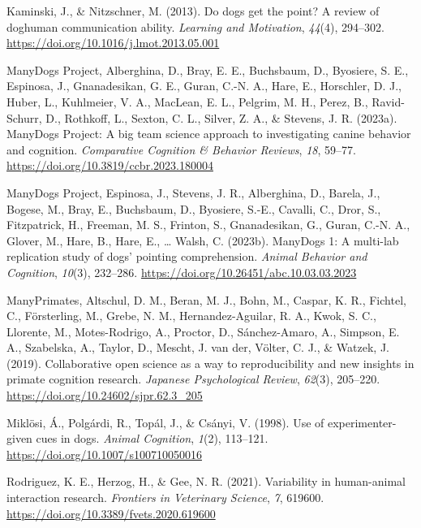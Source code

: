 \documentclass[
  pub,floatsintext]{apa6}
\newlength{\cslhangindent}
\newlength{\cslentryspacingunit} %
\newenvironment{CSLReferences}[2] %
 {%
  \setlength{\parindent}{0pt}
  \ifodd #1
  \let\oldpar\par
  \def\par{\hangindent=\cslhangindent\oldpar}
  \fi
  \setlength{\parskip}{#2\cslentryspacingunit}
 }%
 {}
\begin{document}
\begin{CSLReferences}{1}{0}
\leavevmode{}%
Kaminski, J., \& Nitzschner, M. (2013). Do dogs get the point? {A} review of dog{\textendash}human communication ability. \emph{Learning and Motivation}, \emph{44}(4), 294--302. \url{https://doi.org/10.1016/j.lmot.2013.05.001}

\leavevmode{}%
ManyDogs Project, Alberghina, D., Bray, E. E., Buchsbaum, D., Byosiere, S. E., Espinosa, J., Gnanadesikan, G. E., Guran, C.-N. A., Hare, E., Horschler, D. J., Huber, L., Kuhlmeier, V. A., MacLean, E. L., Pelgrim, M. H., Perez, B., Ravid-Schurr, D., Rothkoff, L., Sexton, C. L., Silver, Z. A., \& Stevens, J. R. (2023a). {ManyDogs Project}: {A} big team science approach to investigating canine behavior and cognition. \emph{Comparative Cognition \& Behavior Reviews}, \emph{18}, 59--77. \url{https://doi.org/10.3819/ccbr.2023.180004}

\leavevmode{}%
ManyDogs Project, Espinosa, J., Stevens, J. R., Alberghina, D., Barela, J., Bogese, M., Bray, E., Buchsbaum, D., Byosiere, S.-E., Cavalli, C., Dror, S., Fitzpatrick, H., Freeman, M. S., Frinton, S., Gnanadesikan, G., Guran, C.-N. A., Glover, M., Hare, B., Hare, E., \ldots{} Walsh, C. (2023b). {ManyDogs} 1: {A} multi-lab replication study of dogs' pointing comprehension. \emph{Animal Behavior and Cognition}, \emph{10}(3), 232--286. \url{https://doi.org/10.26451/abc.10.03.03.2023}

\leavevmode{}%
ManyPrimates, Altschul, D. M., Beran, M. J., Bohn, M., Caspar, K. R., Fichtel, C., Försterling, M., Grebe, N. M., Hernandez-Aguilar, R. A., Kwok, S. C., Llorente, M., Motes-Rodrigo, A., Proctor, D., Sánchez-Amaro, A., Simpson, E. A., Szabelska, A., Taylor, D., Mescht, J. van der, Völter, C. J., \& Watzek, J. (2019). Collaborative open science as a way to reproducibility and new insights in primate cognition research. \emph{Japanese Psychological Review}, \emph{62}(3), 205--220. \url{https://doi.org/10.24602/sjpr.62.3_205}

\leavevmode{}%
Miklösi, Á., Polgárdi, R., Topál, J., \& Csányi, V. (1998). Use of experimenter-given cues in dogs. \emph{Animal Cognition}, \emph{1}(2), 113--121. \url{https://doi.org/10.1007/s100710050016}

\leavevmode{}%
Rodriguez, K. E., Herzog, H., \& Gee, N. R. (2021). Variability in human-animal interaction research. \emph{Frontiers in Veterinary Science}, \emph{7}, 619600. \url{https://doi.org/10.3389/fvets.2020.619600}


\end{CSLReferences}
\end{document}
